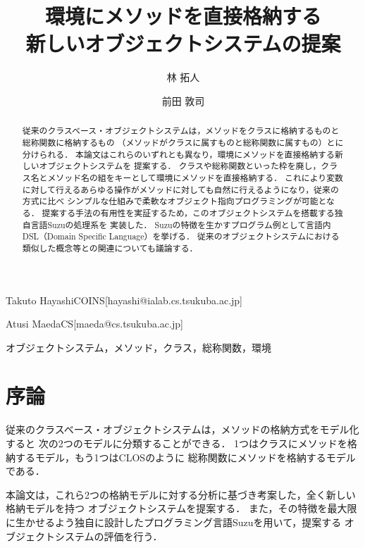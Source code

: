 \documentclass{ipsjprosym}
\begin{document}
\title{環境にメソッドを直接格納する \\ 新しいオブジェクトシステムの提案}


\author{林 拓人}{Takuto Hayashi}{COINS}[hayashi@ialab.cs.tsukuba.ac.jp]
\author{前田 敦司}{Atusi Maeda}{CS}[maeda@cs.tsukuba.ac.jp]

\begin{abstract}
従来のクラスベース・オブジェクトシステムは，メソッドをクラスに格納するものと総称関数に格納するもの
（メソッドがクラスに属すものと総称関数に属すもの）とに分けられる．
本論文はこれらのいずれとも異なり，環境にメソッドを直接格納する新しいオブジェクトシステムを
提案する．
クラスや総称関数といった枠を廃し，クラス名とメソッド名の組をキーとして環境にメソッドを直接格納する．
これにより変数に対して行えるあらゆる操作がメソッドに対しても自然に行えるようになり，従来の方式に比べ
シンプルな仕組みで柔軟なオブジェクト指向プログラミングが可能となる．
提案する手法の有用性を実証するため，このオブジェクトシステムを搭載する独自言語Suzuの処理系を
実装した．
Suzuの特徴を生かすプログラム例として言語内DSL（Domain Specific Language）を挙げる．
従来のオブジェクトシステムにおける類似した概念等との関連についても議論する．
\end{abstract}

\begin{jkeyword}
オブジェクトシステム，メソッド，クラス，総称関数，環境
\end{jkeyword}

\maketitle

\section{序論}

従来のクラスベース・オブジェクトシステムは，メソッドの格納方式をモデル化すると
次の2つのモデルに分類することができる．
1つはクラスにメソッドを格納するモデル，もう1つはCLOS\cite{Ida:2010}のように
総称関数にメソッドを格納するモデルである．

本論文は，これら2つの格納モデルに対する分析に基づき考案した，全く新しい格納モデルを持つ
オブジェクトシステムを提案する．
また，その特徴を最大限に生かせるよう独自に設計したプログラミング言語Suzuを用いて，提案する
オブジェクトシステムの評価を行う．
\end{document}

